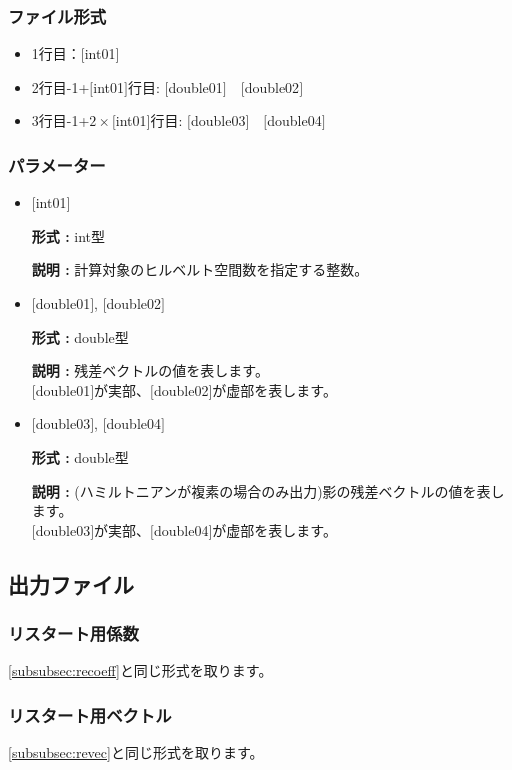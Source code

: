 \documentclass[12pt,titlepage]{jarticle}
\begin{document}
\subsubsection{ファイル形式}
 \begin{itemize}
   \item  1行目：$[$int01$]$
   \item  2行目-1+$[$int01$]$行目: $[$double01$]$~~$[$double02$]$
   \item  3行目-1+$2\times[$int01$]$行目: $[$double03$]$~~$[$double04$]$
  \end{itemize}
\subsubsection{パラメーター}
\begin{itemize}

\item  $[$int01$]$
  
  {\bf 形式 :} int型
  
  {\bf 説明 :} 計算対象のヒルベルト空間数を指定する整数。
  
\item  $[$double01$]$, $[$double02$]$
  
  {\bf 形式 :} double型 

  {\bf 説明 :} 残差ベクトルの値を表します。\\
  $[$double01$]$が実部、$[$double02$]$が虚部を表します。\\

\item  $[$double03$]$, $[$double04$]$
  
  {\bf 形式 :} double型 

  {\bf 説明 :} (ハミルトニアンが複素の場合のみ出力)影の残差ベクトルの値を表します。\\
  $[$double03$]$が実部、$[$double04$]$が虚部を表します。\\

\end{itemize}

\newpage
\subsection{出力ファイル}
\subsubsection{リスタート用係数}\label{subsubsec:ResCoef}
\ref{subsubsec:recoeff}と同じ形式を取ります。
\subsubsection{リスタート用ベクトル}\label{subsubsec:ResVec}
\ref{subsubsec:revec}と同じ形式を取ります。
\end{document}
